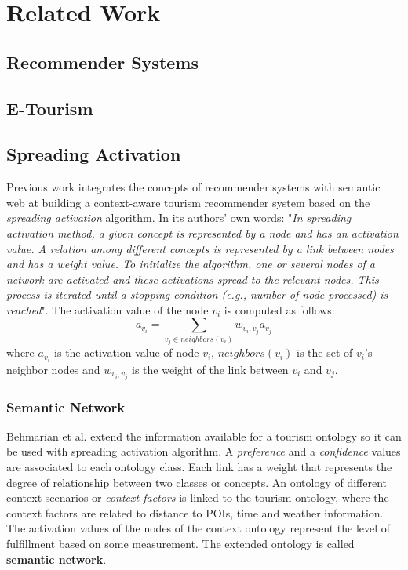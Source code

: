 \section{Related Work}
\subsection{Recommender Systems}
\subsection{E-Tourism}
\subsection{Spreading Activation}
Previous work \cite{bahramian_abbaspour_claramunt_2017} integrates the concepts of recommender systems with semantic web at building a context-aware tourism recommender system based on the \textit{spreading activation} algorithm. In its authors' own words: "\textit{In spreading activation method, a given concept is represented by a node and has an activation value. A relation among different concepts is represented by a link between nodes and has a weight value. To initialize the algorithm, one or several nodes of a network are activated and these activations spread to the relevant nodes. This process is iterated until a stopping condition (e.g., number of node processed) is reached}". The activation value of the node \(v_i\) is computed as follows:
\begin{equation} \label{eq:og_activation}
a_{v_i} = \sum_{v_j \in neighbors(v_i)} w_{v_i, v_j} a_{v_j} 
\end{equation}
where $a_{v_i}$ is the activation value of node $v_i$, $neighbors(v_i)$ is the set of $v_i$'s neighbor nodes and $w_{v_i, v_j}$ is the weight of the link between $v_i$ and $v_j$.

\subsubsection{Semantic Network}
Behmarian et al. \cite{bahramian_abbaspour_claramunt_2017} extend the information available for a tourism ontology so it can be used with spreading activation algorithm. A \textit{preference} and a \textit{confidence} values are associated to each ontology class. Each link has a weight that represents the degree of relationship between two classes or concepts. An ontology of different context scenarios or \textit{context factors} is linked to the tourism ontology, where the context factors are related to distance to POIs, time and weather information. The activation values of the nodes of the context ontology represent the level of fulfillment based on some measurement. The extended ontology is called \textbf{semantic network}.

